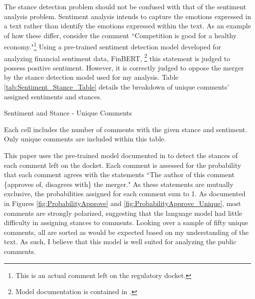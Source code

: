 \documentclass{article}
\begin{document}
\begin{appendices}
The stance detection problem should not be confused with that of the sentiment analysis problem. Sentiment analysis intends to capture the emotions expressed in a text rather than identify the emotions expressed within the text. As an example of how these differ, consider the comment ``Competition is good for a healthy economy."\footnote{This is an actual comment left on the regulatory docket.} Using a pre-trained sentiment detection model developed for analyzing financial sentiment data, FinBERT, \footnote{Model documentation is contained in \citet{araci_finbert_2019}.} this statement is judged to possess positive sentiment. However, it is correctly judged to oppose the merger by the stance detection model used for my analysis. Table \ref{tab:Sentiment_Stance_Table} details the breakdown of unique comments' assigned sentiments and stances. 

\begin{table}
    \caption{Sentiment and Stance - Unique Comments}
    \label{tab:Sentiment_Stance_Table}
    \vspace{-15mm}
    \begin{center}
    
    \end{center}
        \vspace{-5mm}
    \footnotesize{Each cell includes the number of comments with the given stance and sentiment. Only unique comments are included within this table. }
\end{table}

This paper uses the pre-trained model documented in \citet{laurer_less_2024} to detect the stances of each comment left on the docket. Each comment is assessed for the probability that each comment agrees with the statements ``The author of this comment \{approves of, disagrees with\} the merger." As these statements are mutually exclusive, the probabilities assigned for each comment sum to 1. As documented in Figures \ref{fig:ProbabilityApprove} and \ref{fig:ProbabilityApprove_Unique}, most comments are strongly polarized, suggesting that the language model had little difficulty in assigning stances to comments. Looking over a sample of fifty unique comments, all are sorted as would be expected based on my understanding of the text. As such, I believe that this model is well suited for analyzing the public comments.  


\end{appendices}
\end{document}
